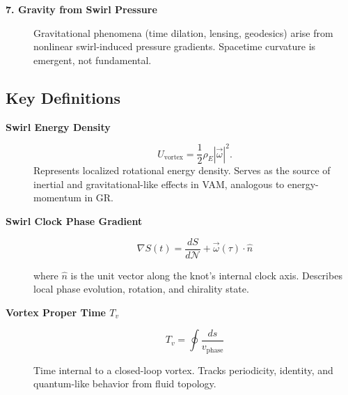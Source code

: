 \begin{description}
        \item[\textbf{7. Gravity from Swirl Pressure}]%
        Gravitational phenomena (time dilation, lensing, geodesics) arise from nonlinear swirl-induced pressure gradients. Spacetime curvature is emergent, not fundamental.
    \end{description}


    \subsection*{Key Definitions}

    \begin{description}

        \item[\textbf{Swirl Energy Density}]%
        \[
            U_{\text{vortex}} = \frac{1}{2} \rho_{\scriptscriptstyle\boldsymbol\!E} |\vec{\omega}|^2.
        \]
        Represents localized rotational energy density. Serves as the source of inertial and gravitational-like effects in VAM, analogous to energy-momentum in GR.

        \item[\textbf{Swirl Clock Phase Gradient}]%

        \begin{equation}
            \boxed{
                \nabla S(t) = \frac{dS}{d\mathcal{N}} + \vec{\omega}(\tau) \cdot \hat{n}
            }
            \label{eq:swirl-clock-gradient}
        \end{equation}

        where \( \hat{n} \) is the unit vector along the knot’s internal clock axis. Describes local phase evolution, rotation, and chirality state.

        \item[\textbf{Vortex Proper Time \( T_v \)}]%

        \begin{equation}
            \boxed{
                T_v = \oint \frac{ds}{v_\text{phase}}
            }
            \label{eq:vortex-proper-time}
        \end{equation}

        Time internal to a closed-loop vortex. Tracks periodicity, identity, and quantum-like behavior from fluid topology.
    \end{description}


